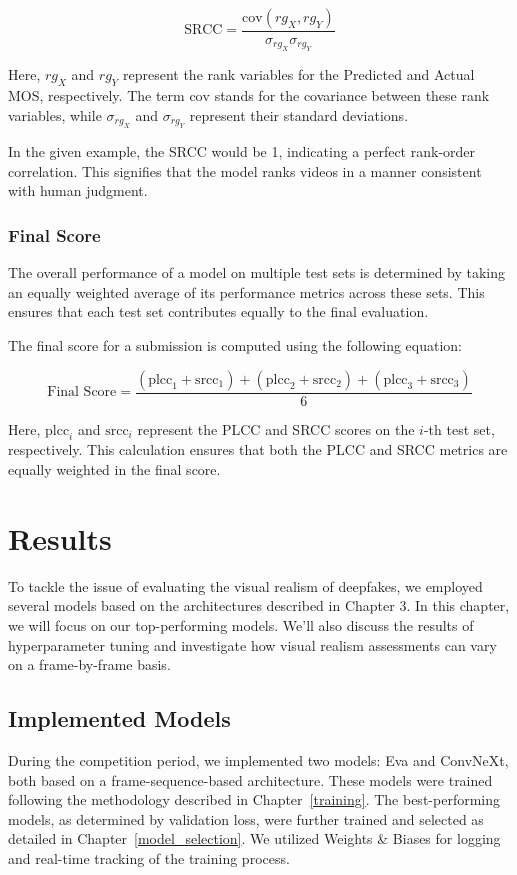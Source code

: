 \documentclass[a4paper,12pt,openright]{book}
\begin{document}
\[
\text{SRCC} = \frac{\text{cov}(rg_X, rg_Y)}{\sigma_{rg_X} \sigma_{rg_Y}}
\]

Here, \(rg_X\) and \(rg_Y\) represent the rank variables for the Predicted and Actual MOS, respectively. The term \(\text{cov}\) stands for the covariance between these rank variables, while \(\sigma_{rg_X}\) and \(\sigma_{rg_Y}\) represent their standard deviations. 

In the given example, the SRCC would be 1, indicating a perfect rank-order correlation. This signifies that the model ranks videos in a manner consistent with human judgment.

\subsection{Final Score}

The overall performance of a model on multiple test sets is determined by taking an equally weighted average of its performance metrics across these sets. This ensures that each test set contributes equally to the final evaluation.

The final score for a submission is computed using the following equation:

\[
\text{Final Score} = \frac{(\text{plcc}_1 + \text{srcc}_1) + (\text{plcc}_2 + \text{srcc}_2) + (\text{plcc}_3 + \text{srcc}_3)}{6}
\]


Here, \(\text{plcc}_i\) and \(\text{srcc}_i\) represent the PLCC and SRCC scores on the \(i\)-th test set, respectively. This calculation ensures that both the PLCC and SRCC metrics are equally weighted in the final score.


\chapter{Results}
\label{chap:results}
To tackle the issue of evaluating the visual realism of deepfakes, we employed several models based on the architectures described in Chapter 3. In this chapter, we will focus on our top-performing models. We'll also discuss the results of hyperparameter tuning and investigate how visual realism assessments can vary on a frame-by-frame basis.

\section{Implemented Models}
During the competition period, we implemented two models: Eva and ConvNeXt, both based on a frame-sequence-based architecture. These models were trained following the methodology described in Chapter~\ref{training}. The best-performing models, as determined by validation loss, were further trained and selected as detailed in Chapter~\ref{model_selection}. We utilized Weights \& Biases for logging and real-time tracking of the training process. 
\end{document}

